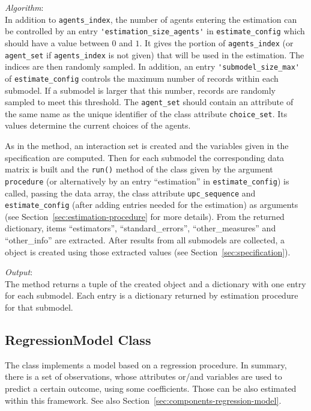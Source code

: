 {\it Algorithm}:~\\[1mm]
In addition to \verb|agents_index|, the number of agents entering the
estimation can be controlled by an entry \verb|'estimation_size_agents'| in
\verb|estimate_config| which should have a value between $0$ and $1$. It gives
the portion of \verb|agents_index| (or \verb|agent_set| if \verb|agents_index|
is not given) that will be used in the estimation. The indices are then
randomly sampled. In addition, an entry \verb|'submodel_size_max'| of 
\verb|estimate_config| controls the maximum number of records within each submodel.
If a submodel is larger that this number, records are randomly sampled to meet this threshold. 
The \verb|agent_set| should contain an attribute of the same
name as the unique identifier of the class attribute \verb|choice_set|. Its
values determine the current choices of the agents.

As in the  method, an interaction set is created and the
variables given in the specification are computed. Then for each submodel the
corresponding data matrix is built and the \verb|run()| method of the class
given by the argument \verb|procedure| (or alternatively by an entry
``estimation'' in \verb|estimate_config|) is called, passing the data array,
the class attribute \verb|upc_sequence| and \verb|estimate_config| (after
adding entries needed for the estimation) as arguments (see
Section~\ref{sec:estimation-procedure} for more details).  From the returned
dictionary, items ``estimators'', ``standard_errors'', ``other_measures'' and
``other_info'' are extracted. After results from all submodels are collected,
a  object is created using those extracted values (see Section~\ref{sec:specification}).

{\it Output}:~\\[1mm]
The method returns a tuple of the created  object and a
dictionary with one entry for each submodel. 
Each entry is a dictionary returned by estimation procedure for that submodel.

\subsection{RegressionModel Class}
%
\label{sec:regression-model}
The  class implements a model based on a regression
procedure. In summary, there is a set of observations, whose attributes or/and
variables are used to predict a certain outcome, using some coefficients.
Those can be also estimated within this framework. See also Section~\ref{sec:components-regression-model}.

